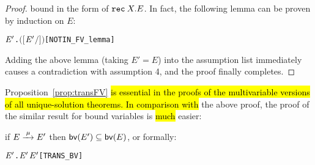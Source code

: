 \begin{proof}
bound in the form of ${\tt rec}\: X . E$. In fact, the following lemma can be
proven by induction on $E$:
\begin{alltt}
\HOLTokenTurnstile{} \HOLSymConst{\HOLTokenForall{}}  \ensuremath{\HOLBoundVar{E}\sp{\prime}}.  \HOLSymConst{\HOLTokenNotIn{}}  \ensuremath{(}\ensuremath{[}  \ensuremath{\HOLBoundVar{E}\sp{\prime}}\ensuremath{/}\ensuremath{]} \ensuremath{)}\hfill{[NOTIN_FV_lemma]}
\end{alltt}
Adding the above lemma (taking $E' = E$) into the assumption list immediately causes
a contradiction with assumption 4, and the proof finally completes.
\end{proof}

Proposition~\ref{prop:transFV} \hl{is essential in the proofs of the
  multivariable versions of all unique-solution
  theorems.
In comparison with} the above proof, the proof of the similar
result for bound variables is \hl{much} easier:
\begin{proposition}
\label{prop:transBV}
if $E \arr{\mu} E'$ then ${{\rm\sf{bv}}}(E') \subseteq {{\rm\sf{bv}}}(E)$, or formally:
\begin{alltt}
\HOLTokenTurnstile{} \HOLSymConst{\HOLTokenForall{}}  \ensuremath{\HOLBoundVar{E}\sp{\prime}}.  \HOLTokenTransBegin{}\HOLTokenTransEnd \ensuremath{\HOLBoundVar{E}\sp{\prime}} \HOLSymConst{\HOLTokenImp{}}  \ensuremath{\HOLBoundVar{E}\sp{\prime}} \HOLSymConst{\HOLTokenSubset{}}  \hfill{[TRANS_BV]}
\end{alltt}
\end{proposition}
